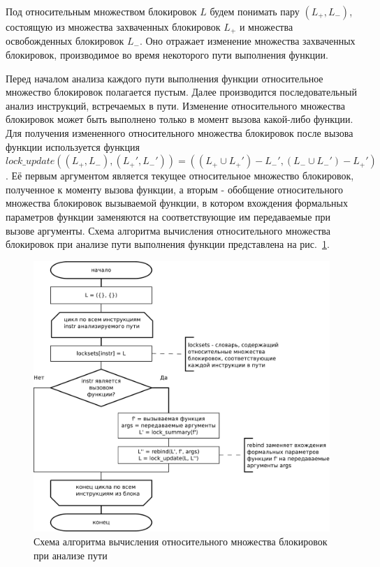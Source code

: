 Под относительным множеством блокировок $L$ будем понимать пару $(L_{+}, L_{-})$, состоящую из множества захваченных блокировок $L_{+}$ и множества освобожденных блокировок $L_{-}$. Оно отражает изменение множества захваченных блокировок, производимое во время некоторого пути выполнения функции.

Перед началом анализа каждого пути выполнения функции относительное множество блокировок полагается пустым. Далее производится последовательный анализ инструкций, встречаемых в пути. Изменение относительного множества блокировок может быть выполнено только в момент вызова какой-либо функции. Для получения измененного относительного множества блокировок после вызова функции используется функция $lock\_update((L_{+}, L_{-}), (L_{+}', L_{-}')) = ((L_{+} \cup L_{+}') - L_{-}', (L_{-} \cup L_{-}') - L_{+}')$. Её первым аргументом является текущее относительное множество блокировок, полученное к моменту вызова функции, а вторым - обобщение относительного множества блокировок вызываемой функции, в котором вхождения формальных параметров функции заменяются на соответствующие им передаваемые при вызове аргументы. Схема алгоритма вычисления относительного множества блокировок при анализе пути выполнения функции представлена на рис.~\ref{fig:build-relative-lockset}.

\begin{figure}
  \centering
  \includegraphics[width=\textwidth]{inc/dia/build-relative-lockset}
  \caption{Схема алгоритма вычисления относительного множества блокировок при анализе пути}
  \label{fig:build-relative-lockset}
\end{figure}

